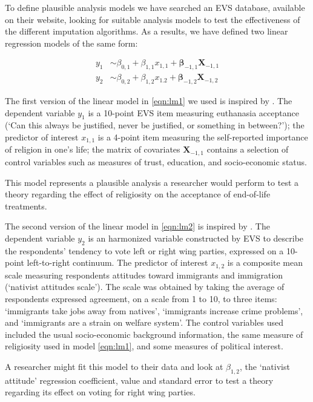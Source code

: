 	To define plausible analysis models we have searched an EVS database, available on their website, 
	looking for suitable analysis models to test the effectiveness of the different imputation algorithms.
	As a results, we have defined two linear regression models of the same form:
	
	\begin{subequations}
	\begin{align}
		y_1 &\sim \beta_{0,1} + \beta_{1,1} x_{1,1} + \bm{\beta}_{-1,1} \bm{X}_{-1,1}  \label{eqn:lm1} \\
		y_2 &\sim \beta_{0,2} + \beta_{1,2} x_{1.2} + \bm{\beta}_{-1,2} \bm{X}_{-1,2}  \label{eqn:lm2}
	\end{align}
	\end{subequations}

	The first version of the linear model in \ref{eqn:lm1} we used is inspired by \cite{koneke:2014}.
	The dependent variable $y_1$ is a 10-point EVS item measuring euthanasia acceptance 
	(`Can this always be justified, never be justified, or something in between?');
	the predictor of interest $x_{1,1}$ is a 4-point item measuring the self-reported importance of religion in 
	one's life;
	the matrix of covariates $\bm{X}_{-1,1}$ contains a selection of control variables such as measures of trust, 
	education, and socio-economic status.

	This model represents a plausible analysis a researcher would perform to test a theory regarding the 
	effect of religiosity on the acceptance of end-of-life treatments.

	The second version of the linear model in \ref{eqn:lm2} is inspired by \cite{immerzeel:2015}.
	The dependent variable $y_2$ is an harmonized variable constructed by EVS to describe the respondents' 
	tendency to vote left or right wing parties, expressed on a 10-point left-to-right continuum.
	The predictor of interest $x_{1,2}$ is a composite mean scale measuring respondents attitudes toward immigrants 
	and immigration (`nativist attitudes scale').
	The scale was obtained by taking the average of respondents expressed agreement, on a scale from 
	1 to 10, to three items: `immigrants take jobs away from natives', `immigrants increase crime problems', and 
	`immigrants are a strain on welfare system'.
	The control variables used included the usual socio-economic background information, the same measure of
	religiosity used in model \ref{eqn:lm1}, and some measures of political interest.

	A researcher might fit this model to their data and look at $\beta_{1,2}$, the `nativist attitude' regression 
	coefficient, value and standard error to test a theory regarding its effect on voting for right wing parties.

